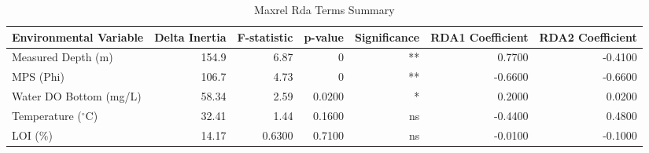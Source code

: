 \begin{table}[htbp]
  \centering
  \caption{Maxrel Rda Terms Summary}
  \label{tab:ref_threshold_sensitivity_MaxRel_rda_terms_summary}
  \small
  \begin{tabular}{lrrrrrr}
    \toprule
    Environmental Variable & Delta Inertia & F-statistic & p-value & Significance & RDA1 Coefficient & RDA2 Coefficient \\
    \midrule
    Measured Depth (m) & 154.9 & 6.87 & 0 & ** & 0.7700 & -0.4100 \\
    MPS (Phi) & 106.7 & 4.73 & 0 & ** & -0.6600 & -0.6600 \\
    Water DO Bottom (mg/L) & 58.34 & 2.59 & 0.0200 & * & 0.2000 & 0.0200 \\
    Temperature ($^{\circ}$C) & 32.41 & 1.44 & 0.1600 & ns & -0.4400 & 0.4800 \\
    LOI (\%) & 14.17 & 0.6300 & 0.7100 & ns & -0.0100 & -0.1000 \\
    \bottomrule
  \end{tabular}
\end{table}
